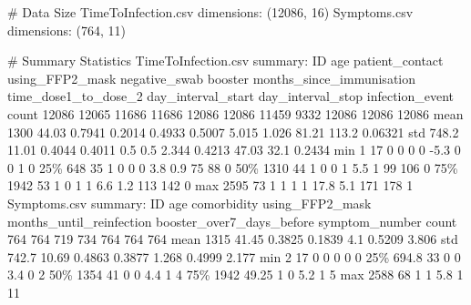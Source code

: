 \documentclass[11pt]{article}
\begin{document}
\begin{codeoutput}
\# Data Size
TimeToInfection.csv dimensions: (12086, 16)
Symptoms.csv dimensions: (764, 11)

\# Summary Statistics
TimeToInfection.csv summary: 
         ID   age  patient\_contact  using\_FFP2\_mask  negative\_swab  booster  months\_since\_immunisation  time\_dose1\_to\_dose\_2  day\_interval\_start  day\_interval\_stop  infection\_event
count 12086 12065            11686            11686          12086    12086                      11459                  9332               12086              12086            12086
mean   1300 44.03           0.7941           0.2014         0.4933   0.5007                      5.015                 1.026               81.21              113.2          0.06321
std   748.2 11.01           0.4044           0.4011            0.5      0.5                      2.344                0.4213               47.03               32.1           0.2434
min       1    17                0                0              0        0                       -5.3                     0                   0                  1                0
25\%     648    35                1                0              0        0                        3.8                   0.9                  75                 88                0
50\%    1310    44                1                0              0        1                        5.5                     1                  99                106                0
75\%    1942    53                1                0              1        1                        6.6                   1.2                 113                142                0
max    2595    73                1                1              1        1                       17.8                   5.1                 171                178                1
Symptoms.csv summary: 
         ID   age  comorbidity  using\_FFP2\_mask  months\_until\_reinfection  booster\_over7\_days\_before  symptom\_number
count   764   764          719              734                       764                        764             764
mean   1315 41.45       0.3825           0.1839                       4.1                     0.5209           3.806
std   742.7 10.69       0.4863           0.3877                     1.268                     0.4999           2.177
min       2    17            0                0                         0                          0               0
25\%   694.8    33            0                0                       3.4                          0               2
50\%    1354    41            0                0                       4.4                          1               4
75\%    1942 49.25            1                0                       5.2                          1               5
max    2588    68            1                1                       5.8                          1              11


\end{codeoutput}
\end{document}
